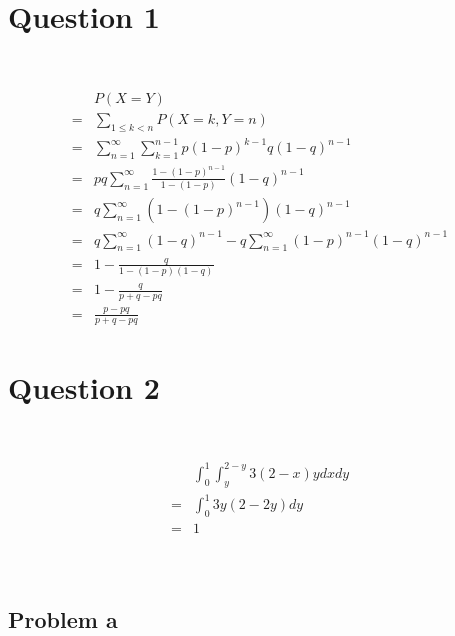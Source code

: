 \documentclass{article}
\begin{document}
\section*{Question 1}

~

\begin{equation*}
    \begin{split}
        &P(X=Y)\\
        =&\sum_{1\leqslant k<n}P(X=k,Y=n)\\
        =&\sum_{n=1}^{\infty}\sum_{k=1}^{n-1}p(1-p)^{k-1}q(1-q)^{n-1}\\
        =&pq\sum_{n=1}^{\infty}\frac{1-(1-p)^{n-1}}{1-(1-p)}(1-q)^{n-1}\\
        =&q\sum_{n=1}^{\infty}(1-(1-p)^{n-1})(1-q)^{n-1}\\
        =&q\sum_{n=1}^{\infty}(1-q)^{n-1}-q\sum_{n=1}^{\infty}(1-p)^{n-1}(1-q)^{n-1}\\
        =&1-\frac{q}{1-(1-p)(1-q)}\\
        =&1-\frac{q}{p+q-pq}\\
        =&\frac{p-pq}{p+q-pq}
    \end{split}
\end{equation*}

\newpage

\section*{Question 2}

~

\begin{equation*}
    \begin{split}
        &\int_{0}^{1}\int_{y}^{2-y}3(2-x)ydxdy\\
        =&\int_{0}^{1}3y(2-2y)dy\\
        =&1\\
    \end{split}
\end{equation*}

~

\subsection*{Problem a}

~
\end{document}
